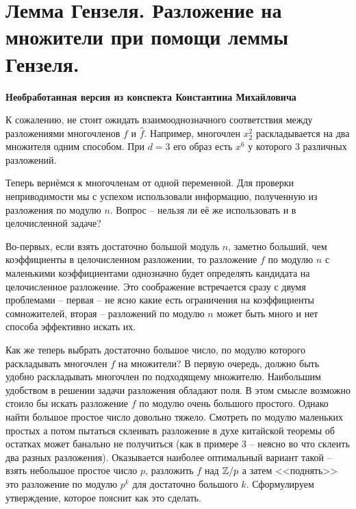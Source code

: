 \section{
 Лемма Гензеля. Разложение на множители при помощи леммы Гензеля.
}

\textbf{Необработанная версия из конспекта Константина Михайловича}


К сожалению, не стоит ожидать взаимооднозначного соответствия между разложениями многочленов $f$ и $\hat{f}$. Например, многочлен $x_2^2$ раскладывается на два множителя одним способом. При $d=3$ его образ есть $x^6$ у которого 3 различных разложений.

Теперь вернёмся к многочленам от одной переменной. Для проверки неприводимости мы с успехом использовали информацию, полученную из разложения по модулю $n$. Вопрос -- нельзя ли её же использовать и в целочисленной задаче? 

Во-первых, если взять достаточно большой модуль $n$, заметно больший, чем коэффициенты в целочисленном разложении, то разложение $f$ по модулю $n$ с маленькими коэффициентами однозначно будет определять кандидата на целочисленное разложение. Это соображение встречается сразу с двумя проблемами -- первая -- не ясно какие есть ограничения на коэффициенты сомножителей, вторая -- разложений по модулю $n$ может быть много и нет способа эффективно искать их.



Как же теперь выбрать достаточно большое число, по модулю которого раскладывать многочлен $f$ на множители? В первую очередь, должно быть удобно раскладывать многочлен по подходящему множителю. Наибольшим удобством в решении задачи разложения обладают поля. В этом смысле возможно стоило бы искать разложение $f$ по модулю очень большого простого. Однако найти большое простое число довольно тяжело. Смотреть по модулю маленьких простых а потом пытаться склеивать разложение в духе китайской теоремы об остатках может банально не получиться (как в примере 3 -- неясно во что склеить два разных разложения). Оказывается наиболее оптимальный вариант такой -- взять небольшое простое число $p$, разложить $f$ над $\mathbb{Z}/p$ а затем <<поднять>> это разложение по модулю $p^k$ для достаточно большого $k$. Сформулируем утверждение, которое пояснит как это сделать.

